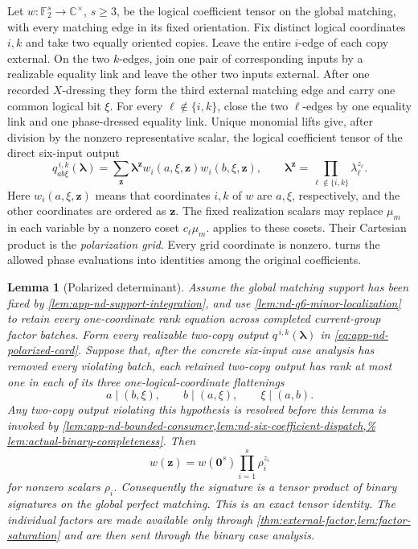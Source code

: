 \documentclass[11pt,letterpaper,onecolumn]{article}
\theoremstyle{plain}
\newtheorem{lemma}[lemma]{Lemma}
\theoremstyle{definition}
\theoremstyle{remark}
\newcommand{\Ftwo}{\mathbb F_2}
\newcommand{\zero}{\mathbf 0}
\begin{document}
Let \(w:\Ftwo^s\to\mathbb C^\times\), \(s\ge3\), be the logical coefficient
tensor on the global matching, with every matching edge in its fixed
orientation.  Fix distinct logical coordinates \(i,k\) and take two equally
oriented copies.  Leave the entire \(i\)-edge of each copy external.  On the
two \(k\)-edges, join one pair of corresponding inputs by a realizable
equality link and leave the other two inputs external. After one recorded
\(X\)-dressing they form the third external matching edge and carry one
common logical bit \(\xi\).  For every \(\ell\notin\{i,k\}\), close the two
\(\ell\)-edges by one equality link and one phase-dressed equality link.
Unique monomial lifts give, after division by the nonzero representative scalar, the logical coefficient tensor of the direct six-input output
\begin{equation}
  q^{\,i,k}_{ab\xi}({\boldsymbol\lambda})
  =\sum_{\mathbf z}{\boldsymbol\lambda}^{\mathbf z} w_i(a,\xi,{\mathbf z})w_i(b,\xi,{\mathbf z}),
  \qquad
  {\boldsymbol\lambda}^{\mathbf z}=\prod_{\ell\notin\{i,k\}}\lambda_\ell^{z_\ell}.
  \label{eq:app-nd-polarized-card}
\end{equation}
Here \(w_i(a,\xi,{\mathbf z})\) means that coordinates \(i,k\) of \(w\) are
\(a,\xi\), respectively, and the other coordinates are ordered as \({\mathbf z}\).
The fixed realization scalars may replace \(\mu_m\) in each variable by a
nonzero coset \(c_\ell\mu_m\).  applies to these cosets.  Their Cartesian product is the \emph{polarization grid}.
Every grid coordinate is nonzero.  turns the
allowed phase evaluations into identities among the original coefficients.

\begin{lemma}[Polarized determinant]
\label{lem:app-nd-polarized-determinant}
Assume the global matching support has been fixed by
\cref{lem:app-nd-support-integration}, and use
\cref{lem:nd-q6-minor-localization} to retain every one-coordinate rank
equation across completed current-group factor batches.  Form every realizable two-copy output
\(q^{\,i,k}({\boldsymbol\lambda})\) in \cref{eq:app-nd-polarized-card}.  Suppose that,
after the concrete six-input case analysis has removed every violating batch,
each retained two-copy output has rank at most one in each of its three
one-logical-coordinate flattenings
\[
 a\mid(b,\xi),\qquad b\mid(a,\xi),\qquad \xi\mid(a,b).
\]
Any two-copy output violating this hypothesis is resolved before
this lemma is invoked
by \cref{lem:app-nd-bounded-consumer,lem:nd-six-coefficient-dispatch,%
lem:actual-binary-completeness}.  Then
\begin{equation}
  w({\mathbf z})=w(\zero^s)\prod_{i=1}^s\rho_i^{z_i}
  \label{eq:app-nd-coefficient-product}
\end{equation}
for nonzero scalars \(\rho_i\).  Consequently the signature is a tensor product
of binary signatures on the global perfect matching.  This is an exact
tensor identity. The individual factors are made available only through
\cref{thm:external-factor,lem:factor-saturation} and are then sent through
the binary case analysis.
\end{lemma}
\end{document}
